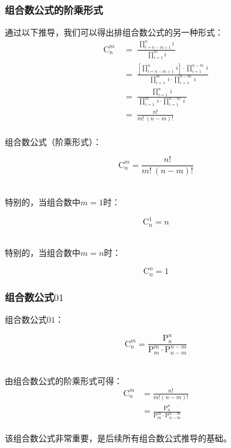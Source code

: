 \documentclass[UTF8]{ctexart}
\begin{document}
\newpage

\subsubsection{组合数公式的阶乘形式}
    通过以下推导，我们可以得出排组合数公式的另一种形式：\vspace{5pt}
    \setcounter{equation}{0}
    \begin{align}
        \mathrm{C}_n^m~
        &=~\frac{~\prod_{i=n-m+1}^{n}i~}{\,\prod_{i=1}^{m}i}\\[4mm]
        &=~\frac{\left[\prod_{i=n-m+1}^n~i\right]\cdot\prod_{i=1}^{n-m}~i}{\prod_{i=1}^{m}~i\cdot\prod_{i=1}^{n-m}~i}\\[4mm]
        &=~\frac{\prod_{i=1}^{n}~i}{~\prod_{i=1}^{m}~i\cdot\prod_{i=1}^{n-m}~i~}\\[4mm]
        &=~\frac{n!}{m!~(n-m)!}
    \end{align}\\
    组合数公式（阶乘形式）：
    \begin{large}
        \begin{equation*}
            \mathrm{C}_n^m=\frac{n!}{m!~(n-m)!}
        \end{equation*}
    \end{large}\\
    特别的，当组合数中$m=1$时：
    \begin{large}
        \begin{equation*}
            \mathrm{C}_n^1=n
        \end{equation*}
    \end{large}\\
    特别的，当组合数中$m=n$时：
    \begin{large}
        \begin{equation*}
            \mathrm{C}_n^n=1
        \end{equation*}
    \end{large}

\subsubsection{组合数公式$01$}
    组合数公式$01$：
    \begin{large}
        \begin{equation*}
            \mathrm{C}_n^m=\frac{\mathrm{P}_n^n}{\mathrm{P}_m^m\cdot\mathrm{P}_{n-m}^{n-m}}
        \end{equation*}
    \end{large}\\
    由组合数公式的阶乘形式可得：
    \setcounter{equation}{0}
    \begin{align}
        \mathrm{C}_n^m
        &=\frac{n!}{m!(n-m)!}\\[3mm]
        &=\frac{\mathrm{P}_n^n}{\mathrm{P}_m^m\cdot\mathrm{P}_{n-m}^{n-m}}
    \end{align}\\
    该组合数公式非常重要，是后续所有组合数公式推导的基础。
\end{document}
